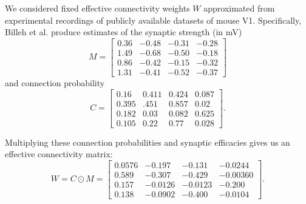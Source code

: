 \documentclass[11pt]{article}
\begin{document}
 
We considered fixed effective connectivity weights $W$ approximated from experimental recordings of publicly available datasets of mouse V1.  Specifically, Billeh et al. \cite{billeh2019systematic} produce estimates of the synaptic strength (in mV)
\begin{equation}
M = \begin{bmatrix} 
0.36 & -0.48 & -0.31 & -0.28 \\
1.49 & -0.68 & -0.50 & -0.18 \\
0.86 & -0.42 & -0.15 & -0.32 \\
1.31 & -0.41 & -0.52 & -0.37 \end{bmatrix}
\end{equation}
and connection probability
\begin{equation}
C = \begin{bmatrix} 0.16 & 0.411 & 0.424 &  0.087 \\
0.395 & .451 & 0.857 & 0.02 \\
0.182 & 0.03 & 0.082 & 0.625 \\
0.105 & 0.22 & 0.77 & 0.028 \end{bmatrix}.
\end{equation}

Multiplying these connection probabilities and synaptic efficacies gives us an effective connectivity matrix:
\begin{equation}
W = C \odot M = \begin{bmatrix} 
0.0576 & -0.197 & -0.131 & -0.0244 \\
0.589 & -0.307 & -0.429 & -0.00360 \\
0.157 & -0.0126  & -0.0123 & -0.200 \\
0.138 & -0.0902 & -0.400 & -0.0104 \end{bmatrix}.
\end{equation}

%




\end{document}
